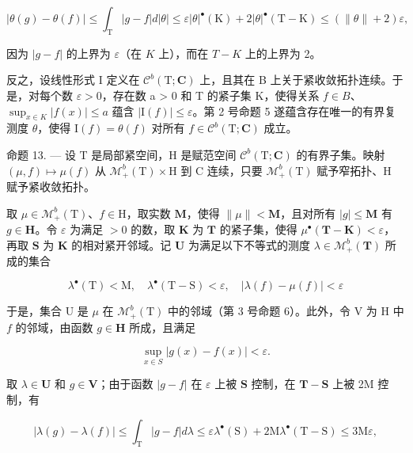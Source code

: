 \[
| \theta (g) - \theta (f) | \leqslant \int_ {\mathrm{T}} | g - f | d | \theta | \leqslant \varepsilon | \theta | ^ {\bullet} (\mathrm{K}) + 2 | \theta | ^ {\bullet} (\mathrm{T} - \mathrm{K}) \leqslant (\| \theta \| + 2) \varepsilon ,
\]

因为 \(|g - f|\) 的上界为 \(\varepsilon\)（在 \(K\) 上），而在 \(T - K\) 上的上界为 2。

反之，设线性形式 I 定义在 \(\mathcal{C}^{b}(\mathrm{T};\mathbf{C})\) 上，且其在 B 上关于紧收敛拓扑连续。于是，对每个数 \(\varepsilon > 0\)，存在数 a \textgreater{} 0 和 T 的紧子集 K，使得关系 \(f \in B\)、\(\sup_{x \in K} |f(x)| \leqslant a\) 蕴含 \(|\mathrm{I}(f)| \leqslant \varepsilon\)。第 2 号命题 5 遂蕴含存在唯一的有界复测度 \(\theta\)，使得 \(\mathrm{I}(f) = \theta(f)\) 对所有 \(f \in \mathcal{C}^{b}(\mathrm{T};\mathbf{C})\) 成立。

命题 13. --- 设 T 是局部紧空间，H 是赋范空间 \(\mathcal{C}^{b}(\mathrm{T};\mathbf{C})\) 的有界子集。映射 \((\mu,f)\mapsto\mu(f)\) 从 \(\mathcal{M}_{+}^{b}(\mathrm{T})\times\mathrm{H}\) 到 C 连续，只要 \(\mathcal{M}_{+}^{b}(\mathrm{T})\) 赋予窄拓扑、H 赋予紧收敛拓扑。

取 \(\mu \in \mathcal{M}_{+}^{b}(\mathrm{T})\)、\(f \in \mathrm{H}\)，取实数 \(\mathbf{M}\)，使得 \(\| \mu \| < \mathbf{M}\)，且对所有 \(|g| \leqslant \mathbf{M}\) 有 \(g \in \mathbf{H}\)。令 \(\varepsilon\) 为满足 \(>0\) 的数，取 \(\mathbf{K}\) 为 \(\mathbf{T}\) 的紧子集，使得 \(\mu^{\bullet}(\mathbf{T} - \mathbf{K}) < \varepsilon\)，再取 \(\mathbf{S}\) 为 \(\mathbf{K}\) 的相对紧开邻域。记 \(\mathbf{U}\) 为满足以下不等式的测度 \(\lambda \in \mathcal{M}_{+}^{b}(\mathbf{T})\) 所成的集合

\[
\lambda^ {\bullet} (\mathrm{T}) <   \mathrm{M}, \quad \lambda^ {\bullet} (\mathrm{T} - \mathrm{S}) <   \varepsilon , \quad | \lambda (f) - \mu (f) | <   \varepsilon
\]

于是，集合 U 是 \(\mu\) 在 \(\mathcal{M}_+^b (\mathrm{T})\) 中的邻域（第 3 号命题 6）。此外，令 V 为 H 中 \(f\) 的邻域，由函数 \(g\in \mathbf{H}\) 所成，且满足

\[
\sup _ {x \in S} | g (x) - f (x) | <   \varepsilon .
\]

取 \(\lambda \in \mathbf{U}\) 和 \(g\in \mathbf{V}\)；由于函数 \(|g - f|\) 在 \(\varepsilon\) 上被 \(\mathbf{S}\) 控制，在 \(\mathbf{T} - \mathbf{S}\) 上被 2M 控制，有

\[
\left| \lambda (g) - \lambda (f) \right| \leqslant \int_ {\mathrm{T}} | g - f | d \lambda \leqslant \varepsilon \lambda^ {\bullet} (\mathrm{S}) + 2 \mathrm{M} \lambda^ {\bullet} (\mathrm{T} - \mathrm{S}) \leqslant 3 \mathrm{M} \varepsilon ,
\]

